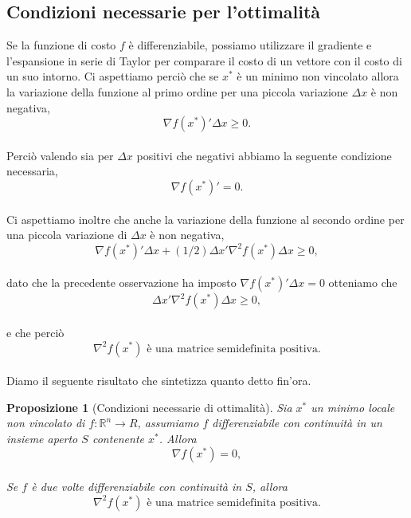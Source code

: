 \documentclass[a4paper, 12pt]{article}
\newtheorem{prop}{Proposizione}
\begin{document}
\subsection{Condizioni necessarie per l'ottimalità}
Se la funzione di costo $f$ è differenziabile, possiamo utilizzare il gradiente e l'espansione in serie di Taylor per comparare il costo di un vettore con il costo di un suo intorno.
Ci aspettiamo perciò che se $x^\ast$ è un minimo non vincolato allora la variazione della funzione al primo ordine per una piccola variazione $\Delta x$ è non negativa,\\
\[\nabla f ( x^\ast )' \Delta x \geq 0.\]\\
Perciò valendo sia per $\Delta x$ positivi che negativi abbiamo la seguente condizione necessaria,\\
\[\nabla f ( x^\ast )' = 0. \]\\
Ci aspettiamo inoltre che anche la variazione della funzione al secondo ordine per una piccola variazione di $\Delta x$ è non negativa,\\
\[\nabla f ( x^\ast )' \Delta x + (1/2) \Delta x' \nabla ^2 f (x^\ast) \Delta x\geq 0,\]\\
dato che la precedente osservazione ha imposto $\nabla f (x^\ast)' \Delta x = 0$ otteniamo che\\
\[\Delta x' \nabla ^2 f (x^\ast) \Delta x\geq 0,\]\\
e che perciò\\
\[\nabla ^2 f (x^\ast) \mbox{ è una matrice semidefinita positiva.}\]\\
Diamo il seguente risultato che sintetizza quanto detto fin'ora.
\begin{prop}[Condizioni necessarie di ottimalità]
Sia $x^\ast$ un minimo locale non vincolato di $f:\mathbb{R}^n \to R$, assumiamo $f$ differenziabile con continuità in un insieme aperto $S$ contenente $x^\ast$. Allora\\
\[\nabla f(x^\ast) = 0,\]\\
Se $f$ è due volte differenziabile con continuità in $S$, allora\\
\[\nabla^2 f(x^\ast) \mbox{ è una matrice semidefinita positiva.}\]
\end{prop}
\end{document}
